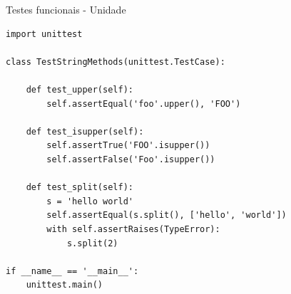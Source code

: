 
\begin{frame}[fragile]{Testes funcionais - Unidade}
\begin{lstlisting}[basicstyle=\ttfamily\scriptsize]
import unittest

class TestStringMethods(unittest.TestCase):

    def test_upper(self):
        self.assertEqual('foo'.upper(), 'FOO')

    def test_isupper(self):
        self.assertTrue('FOO'.isupper())
        self.assertFalse('Foo'.isupper())

    def test_split(self):
        s = 'hello world'
        self.assertEqual(s.split(), ['hello', 'world'])
        with self.assertRaises(TypeError):
            s.split(2)

if __name__ == '__main__':
    unittest.main()
\end{lstlisting}
\end{frame}